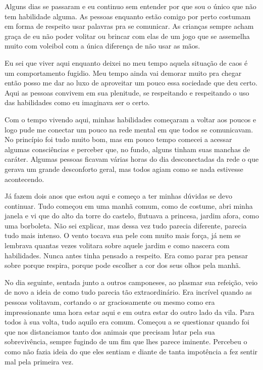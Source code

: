 Alguns dias se passaram e eu continuo sem entender por que sou o único que não tem habilidade alguma. As pessoas enquanto estão comigo por perto costumam em forma de respeito usar palavras pra se comunicar. As crianças sempre acham graça de eu não poder volitar ou brincar com elas de um jogo que se assemelha muito com voleibol com a única diferença de não usar as mãos.

Eu sei que viver aqui enquanto deixei no meu tempo aquela situação de caos é um comportamento fugidio. Meu tempo ainda vai demorar muito pra chegar então posso me dar ao luxo de aproveitar um pouco essa sociedade que deu certo. Aqui as pessoas convivem em sua plenitude, se respeitando e respeitando o uso das habilidades como eu imaginava ser o certo.

Com o tempo vivendo aqui, minhas habilidades começaram a voltar aos poucos e logo pude me conectar um pouco na rede mental em que todos se comunicavam. No princípio foi tudo muito bom, mas em pouco tempo comecei a acessar algumas consciências e perceber que, no fundo, alguns tinham suas manchas de caráter. Algumas pessoas ficavam várias horas do dia desconectadas da rede o que gerava um grande desconforto geral, mas todos agiam como se nada estivesse acontecendo.

Já fazem dois anos que estou aqui e começo a ter minhas dúvidas se devo continuar. Tudo começou em uma manhã comum, como de costume, abri minha janela e vi que do alto da torre do castelo, flutuava a princesa, jardim afora, como uma borboleta. Não sei explicar, mas dessa vez tudo parecia diferente, parecia tudo mais intenso. O vento tocava sua pele com muito mais força, já nem se lembrava quantas vezes volitara sobre aquele jardim e como nascera com habilidades. Nunca antes tinha pensado a respeito. Era como parar pra pensar sobre porque respira, porque pode escolher a cor dos seus olhos pela manhã.

No dia seguinte, sentada junto a outros camponeses, ao plasmar sua refeição, veio de novo a ideia de como tudo parecia tão extraordinário. Era incrível quando as pessoas volitavam, cortando o ar graciosamente ou mesmo como era impressionante uma hora estar aqui e em outra estar do outro lado da vila. Para todos à sua volta, tudo aquilo era comum. Começou a se questionar quando foi que nos distanciamos tanto dos animais que precisam lutar pela sua sobrevivência, sempre fugindo de um fim que lhes parece iminente. Percebeu o como não fazia ideia do que eles sentiam e diante de tanta impotência a fez sentir mal pela primeira vez.

